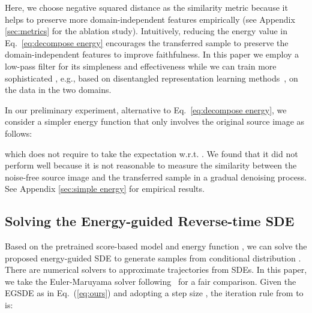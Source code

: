 \documentclass{article}
\begin{document}
Here, we choose negative squared  distance as the similarity metric because it helps to preserve more domain-independent features empirically (see Appendix \ref{sec:metrics} for the ablation study). Intuitively, reducing the energy value in Eq.~\eqref{eq:decompose energy} encourages the transferred sample to preserve the domain-independent features to improve faithfulness. 
In this paper we employ a low-pass filter for its simpleness and effectiveness while we can train more sophisticated , e.g., based on disentangled representation learning methods~\cite{sanchez2020learning,chen2016infogan,higgins2016beta,kim2018disentangling,liu2018unified}, on the data in the two domains.
 
In our preliminary experiment, alternative to Eq.~\eqref{eq:decompose energy}, we consider a simpler energy function that only involves the original source image  as follows:

which does not require to take the expectation w.r.t. . We found that it did not perform well because it is not reasonable to measure the similarity between the noise-free source image and the transferred sample in a gradual denoising process. See Appendix \ref{sec:simple energy} for empirical results.





































\subsection{Solving the Energy-guided Reverse-time SDE}



Based on the pretrained score-based model  and energy function , we can solve the proposed energy-guided SDE to generate samples from conditional distribution . There are numerical solvers to approximate trajectories from SDEs. In this paper, we take the Euler-Maruyama solver following~\cite{meng2021sdedit} for a fair comparison. Given the EGSDE as in Eq.~(\ref{eq:ours}) and adopting a step size , the iteration rule from  to  is:
\end{document}
